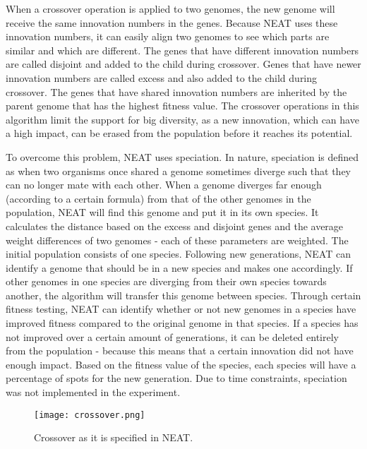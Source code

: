 When a crossover operation is applied to two genomes, the new genome will receive the same innovation numbers in the genes.
Because NEAT uses these innovation numbers, it can easily align two genomes to see which parts are similar and which are different.
The genes that have different innovation numbers are called disjoint and added to the child during crossover.
Genes that have newer innovation numbers are called excess and also added to the child during crossover.
The genes that have shared innovation numbers are inherited by the parent genome that has the highest fitness value.
The crossover operations in this algorithm limit the support for big diversity, as a new innovation, which can have a high impact, can be erased from the population before it reaches its potential.

To overcome this problem, NEAT uses speciation.
In nature, speciation is defined as when two organisms once shared a genome sometimes diverge such that they can no longer mate with each other.
When a genome diverges far enough (according to a certain formula) from that of the other genomes in the population, NEAT will find this genome and put it in its own species.
It calculates the distance based on the excess and disjoint genes and the average weight differences of two genomes - each of these parameters are weighted.
The initial population consists of one species.
Following new generations, NEAT can identify a genome that should be in a new species and makes one accordingly.
If other genomes in one species are diverging from their own species towards another, the algorithm will transfer this genome between species.
Through certain fitness testing, NEAT can identify whether or not new genomes in a species have improved fitness compared to the original genome in that species.
If a species has not improved over a certain amount of generations, it can be deleted entirely from the population - because this means that a certain innovation did not have enough impact.
Based on the fitness value of the species, each species will have a percentage of spots for the new generation.
Due to time constraints, speciation was not implemented in the experiment.

\begin{figure}[H]
\centering
\texttt{[image: crossover.png]}
\caption{Crossover as it is specified in NEAT.}
\label{fig:cross}
\end{figure}

